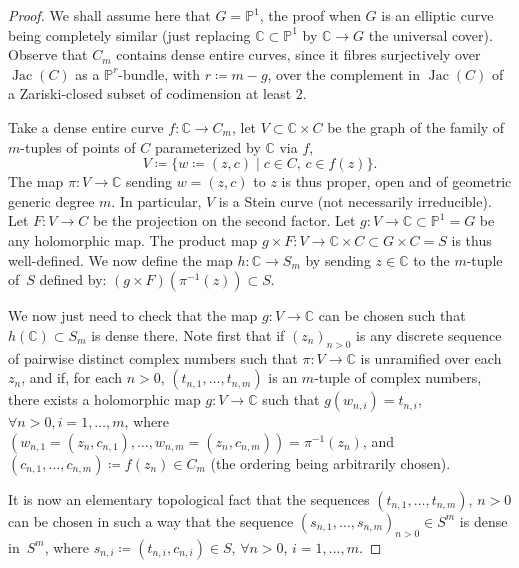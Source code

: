 \documentclass[JEP,XML,SOM,Unicode, NoEqCountersInSection,NoFloatCountersInSection,published]{cedram}
\DeclareMathOperator{\Jac}{Jac}
\theoremstyle{theorem}
\theoremstyle{definition}
\def\bC{{\mathbb C}}
\def\bP{{\mathbb P}}
\begin{document}
\begin{proof}We shall assume here that $G=\bP^1$, the proof when $G$ is an elliptic curve being completely similar (just replacing $\bC\subset \bP^1$ by $\bC\to G$ the universal cover). Observe that $C_m$ contains dense entire curves, since it fibres surjectively over $\Jac(C)$ as a $\bP^r$-bundle, with $r\coloneqq m-g$, over the complement in $\Jac(C)$ of a Zariski-closed subset of codimension at least $2$.

Take a dense entire curve $f:\bC\to C_m$, let $V\subset \bC\times C$ be the graph of the family of $m$-tuples of points of $C$ parameterized by $\bC$ via $f$, \ie
\[
V\coloneqq \{w\coloneqq (z,c)\mid c\in C,\, c\in f(z)\}.
\]
The map $\pi:V\to \bC$ sending $w=(z,c)$ to $z$ is thus proper, open and of geometric generic degree $m$. In particular, $V$ is a Stein curve (not necessarily irreducible). Let $F:V\to C$ be the projection on the second factor. Let $g:V\to \bC\subset \bP^1=G$ be any holomorphic map. The product map $g\times F: V\to \bC\times C\subset G\times C=S$ is thus well-defined. We now define the map $h:\bC\to S_m$ by sending $z\in \bC$ to the $m$-tuple of~$S$ defined by: $(g\times F)(\pi^{-1}(z))\subset S$.

We now just need to check that the map $g:V\to \bC$ can be chosen such that $h(\bC)\subset S_{m}$ is dense there. Note first that if $(z_n)_{n>0}$ is any discrete sequence of pairwise distinct complex numbers such that $\pi:V\to \bC$ is unramified over each $z_n$, and if, for each $n>0$, $(t_{n,1},\dots, t_{n,m})$ is an $m$-tuple of complex numbers, there exists a holomorphic map $g:V\to \bC$ such that $g(w_{n,i})=t_{n,i}$, $\forall n>0,i=1,\dots,m$, where $(w_{n,1}\!=\!(z_n,c_{n,1}),\dots, w_{n,m}\!=\!(z_n,c_{n,m}))\!=\!\pi^{-1}(z_n)$, and $(c_{n,1},\dots,c_{n,m})\!\coloneqq\! f(z_n)\!\in\!C_m$ (the ordering being arbitrarily chosen).

It is now an elementary topological fact that the sequences $(t_{n,1},\dots,t_{n,m})$, $n>0$ can be chosen in such a way that the sequence $(s_{n,1},\dots,s_{n,m})_{n>0}\in S^m$ is dense in~$S^m$, where $s_{n,i}\coloneqq (t_{n,i},c_{n,i})\in S$, $\forall n>0$, $i=1,\dots,m$. \end{proof}
\end{document}

